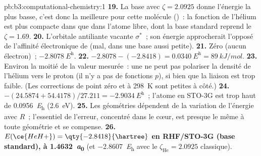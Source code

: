 \begin{solution}{pb:b3:computational-chemistry:1}
\textbf{19.} La base avec $\zeta = 2.0925$ donne l'énergie la plus basse,
c'est donc la meilleure pour cette molécule ()~: la
fonction de l'hélium est plus compacte dans  que dans l'atome
libre, dont la base standard reprend le $\zeta = 1.69$.
\textbf{20.} L'orbitale antiliante vacante $\sigma^*$~; son énergie
approcherait l'opposé de l'affinité électronique de  (mal, dans
une base aussi petite).
\textbf{21.} Zéro (aucun électron)~; $\qty{-2.8078}{\hartree}$.
\textbf{22.} $-2.8078 - (-2.8418) = \qty{0.0340}{\hartree} = \qty{89}{kJ/mol}$.
\textbf{23.} Environ la moitié de la valeur mesurée~: une  ne
peut pas polariser la densité de l'hélium vers le proton (il n'y a pas
de fonctions $p$), si bien que la liaison est trop faible. (Les
corrections de point zéro et à \qty{298}{K} sont petites à côté.)
\textbf{24.} $-(24.5874 + 54.4178)/27.211 = \qty{-2.9034}{\hartree}$~;
l'atome en STO-3G est trop haut de \qty{0.0956}{\hartree} (\qty{2.6}{eV}).
\textbf{25.} Les géométries dépendent de la variation de l'énergie avec
$R$~; l'essentiel de l'erreur, concentré dans le cœur, est presque le
même à toute géométrie et se compense.
\textbf{26.} \textbf{$E(\ce{HeH+}) = \qty{-2.8418}{\hartree}$ en RHF/STO-3G
(base standard), à \qty{1.4632}{\bohr}} (et \qty{-2.8607}{\hartree} avec
le $\zeta_{\mathrm{He}} = 2.0925$ classique).
\end{solution}
